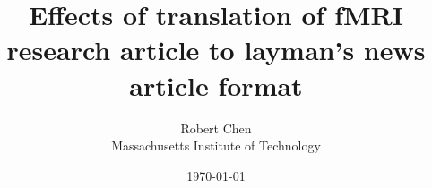 


\title{Effects of translation of fMRI research article to layman's news article format}

\author{
Robert Chen
\vspace{0.5in}\\
Massachusetts Institute of Technology
\vspace{1in}
}


\date{
\today
}

